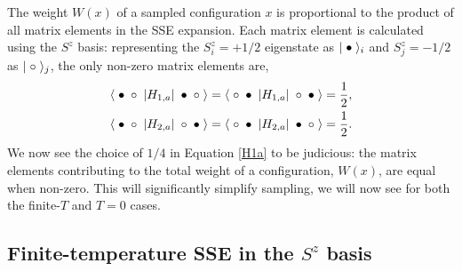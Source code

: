 \documentclass[vecphys]{svmult}
\begin{document}
The weight $W(x)$ of a sampled configuration $x$ is proportional to the product of all matrix elements in the SSE expansion.  Each matrix element is calculated using the $S^z$ basis: representing the $S^z_i=+1/2$ eigenstate as $|\hspace{1mm} \bullet \hspace{1mm} \rangle_i$ and  $S^z_j=-1/2$ as $|\hspace{1mm} \circ \hspace{1mm} \rangle_j$, the only non-zero matrix elements are,
\begin{eqnarray}
\langle \hspace{1mm} \bullet \hspace{1mm}  \circ \hspace{1mm}  | H_{1,a} | \hspace{1mm} \bullet \hspace{1mm} \circ \hspace{1mm} \rangle = 
\langle \hspace{1mm} \circ \hspace{1mm}  \bullet \hspace{1mm}  | H_{1,a} | \hspace{1mm} \circ \hspace{1mm} \bullet \hspace{1mm} \rangle = \frac{1}{2}, \label {Hdiag} \\
\langle \hspace{1mm} \bullet \hspace{1mm}  \circ \hspace{1mm}  | H_{2,a} | \hspace{1mm} \circ \hspace{1mm} \bullet \hspace{1mm} \rangle =
\langle \hspace{1mm} \circ \hspace{1mm}  \bullet \hspace{1mm}  | H_{2,a} | \hspace{1mm} \bullet \hspace{1mm} \circ \hspace{1mm} \rangle =
\frac{1}{2}. \label{Hod}
\end{eqnarray} 
We now see the choice of $1/4$ in Equation \ref{H1a} to be judicious: the matrix elements contributing to the total weight of a configuration, $W(x)$, are equal when non-zero.  This will significantly simplify sampling, we will now see for both the finite-$T$ and $T=0$ cases.


\subsection{Finite-temperature SSE in the $S^z$ basis} \label{HeisfiniteT}
\end{document}
